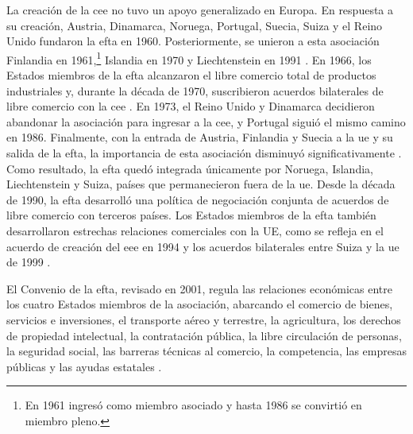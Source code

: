 La creación de la \acrfull{cee} no tuvo un apoyo generalizado en Europa. En respuesta a su creación, Austria, Dinamarca, Noruega, Portugal, Suecia, Suiza y el Reino Unido fundaron la \acrfull{efta} en 1960. Posteriormente, se unieron a esta asociación Finlandia en 1961,\footnote{En 1961 ingresó como miembro asociado y hasta 1986 se convirtió en miembro pleno.} Islandia en 1970 y Liechtenstein en 1991 \parencite[p.~181]{Leuffen2022}.
En 1966, los Estados miembros de la \gls{efta} alcanzaron el libre comercio total de productos industriales y, durante la década de 1970, suscribieron acuerdos bilaterales de libre comercio con la \gls{cee} \parencite{EFTA}. En 1973, el Reino Unido y Dinamarca decidieron abandonar la asociación para ingresar a la \gls{cee}, y Portugal siguió el mismo camino en 1986. Finalmente, con la entrada de Austria, Finlandia y Suecia a la \gls{ue} y su salida de la \gls{efta}, la importancia de esta asociación disminuyó significativamente \parencite[p.~69]{Leuffen2022}. Como resultado, la \gls{efta} quedó integrada únicamente por Noruega, Islandia, Liechtenstein y Suiza, países que permanecieron fuera de la \gls{ue}. Desde la década de 1990, la \gls{efta} desarrolló una política de negociación conjunta de acuerdos de libre comercio con terceros países. Los Estados miembros de la \gls{efta} también desarrollaron estrechas relaciones comerciales con la UE, como se refleja en el acuerdo de creación del \acrfull{eee} en 1994 y los acuerdos bilaterales entre Suiza y la \gls{ue} de 1999 \parencite{EFTA_Convention_overview}. 


El Convenio de la \gls{efta}, revisado en 2001, regula las relaciones económicas entre los cuatro Estados miembros de la asociación, abarcando el comercio de bienes, servicios e inversiones, el transporte aéreo y terrestre, la agricultura, los derechos de propiedad intelectual, la contratación pública, la libre circulación de personas, la seguridad social, las barreras técnicas al comercio, la competencia, las empresas públicas y las ayudas estatales \parencite{EFTA_Convention}. 


